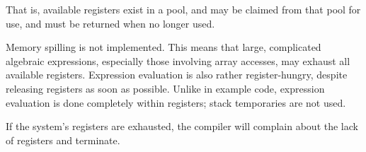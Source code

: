 \documentclass[12pt]{amsart}
\begin{document}
That is, available registers exist in a pool, and may be claimed
from that pool for use, and must be returned when no longer used. 

Memory spilling is not implemented. This means that large, complicated
algebraic expressions, especially those involving array accesses, may
exhaust all available registers. Expression evaluation is also rather
register-hungry, despite releasing registers as soon as
possible. Unlike in example code, expression evaluation is done
completely within registers; stack temporaries are not used.

If the system's registers are exhausted, the compiler will complain
about the lack of registers and terminate.
\end{document}
